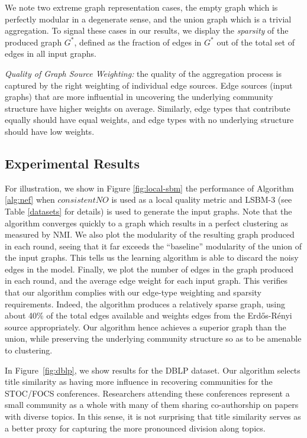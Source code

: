 \documentclass[twoside,twocolumn]{article}
\newcommand{\er}{Erd\H{o}s-R\'{e}nyi }
\begin{document}
We note two extreme graph representation cases, the empty graph which is
perfectly modular in a degenerate sense, and the union graph which is a trivial
aggregation. To signal these cases in our results, we display the
\emph{sparsity} of the produced graph $G^*$, defined as the fraction of edges
in $G^*$ out of the total set of edges in all input graphs. 

{\em Quality of Graph Source Weighting:} the quality of the aggregation process
is captured by the right weighting of individual edge sources. Edge sources (input
graphs) that are more influential in uncovering the underlying community
structure have higher weights on average. Similarly, edge types that contribute
equally should have equal weights, and edge types with no underlying structure
should have low weights.

\subsection{Experimental Results}

\label{sec:results}

For illustration, we show in Figure \ref{fig:local-sbm} the performance of
Algorithm \ref{alg:nef} when $consistentNO$ is used as a local quality metric
and LSBM-3 (see Table \ref{datasets} for details) is used to generate the input
graphs. Note that the algorithm converges quickly to a graph which results in a
perfect clustering as measured by NMI. We also plot the modularity of the
resulting graph produced in each round, seeing that it far exceeds the
``baseline'' modularity of the union of the input graphs. This tells us the
learning algorithm is able to discard the noisy edges in the model. Finally, we
plot the number of edges in the graph produced in each round, and the average
edge weight for each input graph. This verifies that our algorithm complies
with our edge-type weighting and sparsity requirements. Indeed, the algorithm
produces a relatively sparse graph, using about 40\% of the total edges
available and weights edges from the \er source appropriately.  Our algorithm
hence achieves a superior graph than the union, while preserving the underlying
community structure so as to be amenable to clustering. 

In Figure~\ref{fig:dblp}, we show results for the DBLP dataset. 
Our algorithm selects title similarity as having more influence in recovering
communities for the STOC/FOCS conferences. Researchers attending these
conferences represent a small community as a whole with many of them sharing
co-authorship on papers with diverse topics. In this sense, it is not
surprising that title similarity serves as a better proxy for capturing the
more pronounced division along topics. 
\end{document}
